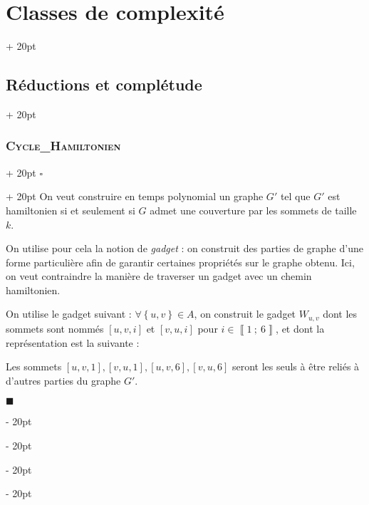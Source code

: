 \documentclass[a4paper, 12pt, twoside]{article}
\newcommand{\nset}[2]{\left\llbracket #1\ ;\ #2 \right\rrbracket}
\newcommand{\set}[1]{\left\{ #1 \right\}}
\newcommand{\ind}[1][20pt]{\advance\leftskip + #1}
\newcommand{\deind}[1][20pt]{\advance\leftskip - #1}
\newenvironment{indt}[2][20pt]{#2 \par \ind[#1]}{\par \deind} %
\newenvironment{proof}[1][{}]{\begin{indt}{$\square$ #1}}{$\blacksquare$ \end{indt}}
\begin{document}
\begin{indt}{\section{Classes de complexité}}
\begin{indt}{\subsection{Réductions et complétude}}
\begin{indt}{\subsubsection{\textsc{Cycle\_Hamiltonien}}}
\begin{proof}
                    On veut construire en temps polynomial un graphe $G'$ tel que $G'$ est hamiltonien si et seulement si $G$ admet une couverture par les sommets de taille $k$.

                    \vspace{6pt}
                    
                    On utilise pour cela la notion de \emph{gadget} : on construit des parties de graphe d'une forme particulière afin de garantir certaines propriétés sur le graphe obtenu. Ici, on veut contraindre la manière de traverser un gadget avec un chemin hamiltonien.

                    On utilise le gadget suivant : $\forall \set{u, v} \in A$, on construit le gadget $W_{u, v}$ dont les sommets sont nommés $[u, v, i]$ et $[v, u, i]$ pour $i \in \nset 1 6$, et dont la représentation est la suivante :

                    \begin{center}
                    \end{center}

                    Les sommets $[u, v, 1], [v, u, 1], [u, v, 6], [v, u, 6]$ seront les seuls à être reliés à d'autres parties du graphe $G'$.


\end{proof}
\end{indt}
\end{indt}
\end{indt}
\end{document}
